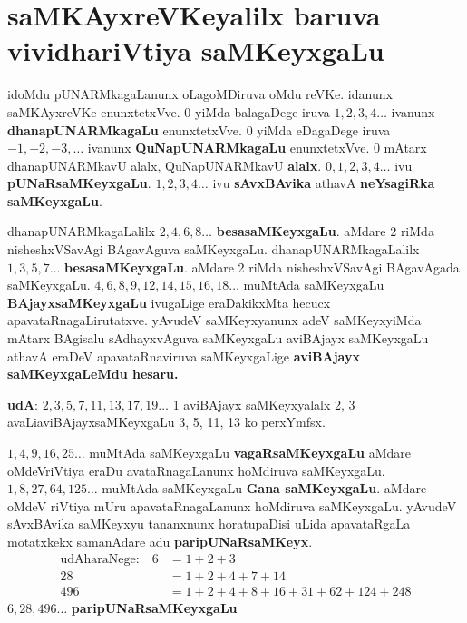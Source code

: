 \chapter{saMKAyxreVKeyalilx baruva vividhariVtiya saMKeyxgaLu}

\begin{figure}[!h]
\end{figure}
idoMdu pUNARMkagaLanunx oLagoMDiruva oMdu reVKe. idanunx saMKAyxreVKe enunxtetxVve.
$0$ yiMda balagaDege iruva $1,2,3,4\ldots$ ivanunx \textbf{dhanapUNARMkagaLu} enunxtetxVve.
$0$ yiMda eDagaDege iruva $-1, -2, -3, \ldots$ ivanunx \textbf{QuNapUNARMkagaLu} enunxtetxVve.
$0$ mAtarx dhanapUNARMkavU alalx, QuNapUNARMkavU \textbf{alalx}.
$0, 1, 2, 3, 4\ldots$ ivu \textbf{pUNaRsaMKeyxgaLu}.
$1, 2, 3, 4\ldots$ ivu \textbf{sAvxBAvika} athavA \textbf{neYsagiRka saMKeyxgaLu}.

dhanapUNARMkagaLalilx $2, 4, 6, 8\ldots$ \textbf{besasaMKeyxgaLu}. aMdare {\rm 2} riMda nisheshxVSavAgi BAgavAguva saMKeyxgaLu.
dhanapUNARMkagaLalilx $1, 3, 5, 7\ldots$ \textbf{besasaMKeyxgaLu}. aMdare {\rm 2} riMda nisheshxVSavAgi BAgavAgada saMKeyxgaLu.
$4, 6, 8, 9, 12, 14, 15, 16, 18\ldots$ muMtAda saMKeyxgaLu \textbf{BAjayxsaMKeyxgaLu} ivugaLige eraDakikxMta hecucx apavataRnagaLiru\-tatxve.
yAvudeV saMKeyxyanunx adeV saMKeyxyiMda mAtarx BAgisalu sAdhayxvAguva saMKeyxgaLu aviBAjayx saMKeyxgaLu athavA eraDeV apavataRnaviruva saMKeyxgaLige \textbf{aviBAjayx saMKeyxgaLeMdu hesaru.}

\textbf{udA}: $2, 3, 5, 7, 11, 13, 17, 19 \ldots$ {\rm 1} aviBAjayx saMKeyxyalalx {\rm 2, 3} avaLiaviBAjayxsaMKeyxgaLu {\-\rm 3, 5}, {\rm 11, 13} ko perxYmfsx.

$1, 4, 9, 16, 25\ldots$ muMtAda saMKeyxgaLu \textbf{vagaRsaMKeyxgaLu} aMdare oMdeV\break riVtiya eraDu avataRnagaLanunx hoMdiruva saMKeyxgaLu.
$1, 8, 27, 64, 125\ldots$ muMtAda saMKeyxgaLu \textbf{Gana saMKeyxgaLu}. aMdare oMdeV riVtiya mUru apavataRna\-gaLanunx hoMdiruva saMKeyxgaLu.
yAvudeV sAvxBAvika saMKeyxyu tananxnunx horatupaDisi uLida apavataRgaLa motatxkekx samanAdare adu \textbf{paripUNaRsaMKeyx}.
\begin{align*}
\text{udAharaNege:}\quad  6 &= 1+2+3\\
28 &= 1+2+4+7+14\\
496 &= 1+2+4+8+16+31+62+124+248
\end{align*} 
$6,28,496\ldots$ \textbf{paripUNaRsaMKeyxgaLu}

